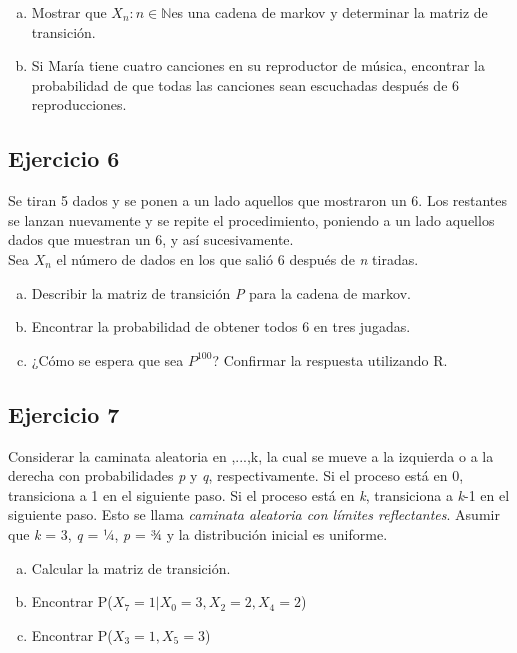 \documentclass[12pt, a4paper]{article}
\begin{document}
\begin{enumerate}[(a)]
	\item Mostrar que \textbraceleft $X_n : n \in \mathbb{N} $\textbraceright  es una cadena de markov y determinar la matriz de transición.
	\item  Si María tiene cuatro canciones en su reproductor de música, encontrar la probabilidad de que todas las canciones sean escuchadas después de 6 reproducciones.
 \end{enumerate}

\subsection*{Ejercicio 6}
Se tiran 5 dados y se ponen a un lado aquellos que mostraron un 6. Los restantes se lanzan nuevamente y se repite el procedimiento, poniendo a un lado aquellos dados que muestran un 6, y así sucesivamente.
\\Sea $X_n$ el número de dados en los que salió 6 después de \textit{n} tiradas.
\begin{enumerate}[(a)]
	\item Describir la matriz de transición \textit{P} para la cadena de markov.
	\item  Encontrar la probabilidad de obtener todos 6 en tres jugadas.
	\item ¿Cómo se espera que sea $P^{100}$? Confirmar la respuesta utilizando R.
 \end{enumerate}


\subsection*{Ejercicio 7}
Considerar la caminata aleatoria en ,...,k\textbraceright, la cual se mueve a la izquierda o a la derecha con probabilidades \textit{p} y \textit{q}, respectivamente. Si el proceso está en 0, transiciona a 1 en el siguiente paso. Si el proceso está en \textit{k}, transiciona a \textit{k}-1 en el siguiente paso. Esto se llama \textit{caminata aleatoria con límites reflectantes}. Asumir que \textit{k} = 3, \textit{q} = ¼, \textit{p} = ¾ y la distribución inicial es uniforme.
\begin{enumerate}[(a)]
	\item Calcular la matriz de transición.
	\item  Encontrar P($X_7= 1 | X_0=3,X_2=2,X_4=2$) 
	\item Encontrar P($X_3=1,X_5=3$)
 \end{enumerate}
\end{document}
